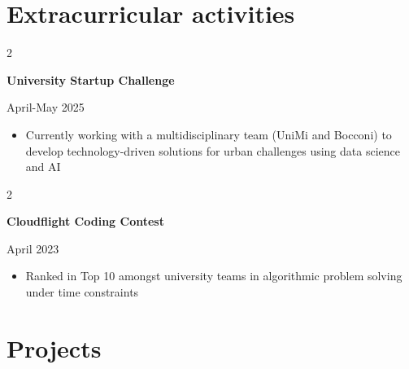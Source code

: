 \documentclass[10pt, letterpaper]{article}
\newenvironment{highlights}{
    \begin{itemize}[
        topsep=0.10 cm,
        parsep=0.10 cm,
        partopsep=0pt,
        itemsep=0pt,
        leftmargin=0 cm + 10pt
    ]
}{
    \end{itemize}
} %
\newenvironment{twocolentry}[2][]{
    \onecolentry
    \def\secondColumn{#2}
    \setcolumnwidth{\fill, 4.5 cm}
    \begin{paracol}{2}
}{
    \switchcolumn \raggedleft \secondColumn
    \end{paracol}
    \endonecolentry
} %
\begin{document}

    \section{Extracurricular activities}
        
        \begin{samepage}
            \begin{twocolentry}{
               April-May 2025
            }
                \textbf{University Startup Challenge}
            \end{twocolentry}
            \begin{highlights}
              \item Currently working with a multidisciplinary team (UniMi and Bocconi) to develop technology-driven solutions for urban challenges using data science and AI
            \end{highlights}

            \vspace{0.10 cm}

            \begin{twocolentry}{
               April 2023
            }
                \textbf{Cloudflight Coding Contest}
            \end{twocolentry}
            \begin{highlights}
              \item Ranked in Top 10 amongst university teams in algorithmic problem solving under time constraints
            \end{highlights}
            
        \end{samepage}
    
    \section{Projects}
\end{document}
